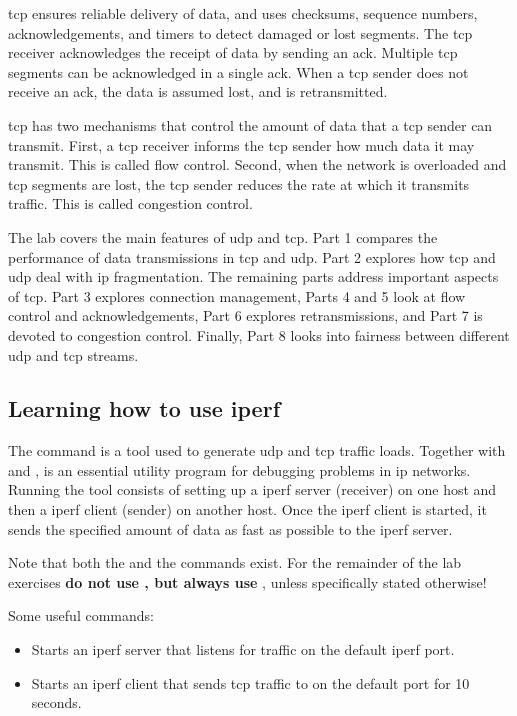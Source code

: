 \ac{tcp} ensures reliable delivery of data, and uses checksums, sequence numbers, acknowledgements, and timers to detect damaged or lost segments. The \ac{tcp} receiver acknowledges the receipt of data by sending an \ac{ack}. Multiple \ac{tcp} segments can be acknowledged in a single \ac{ack}. When a \ac{tcp} sender does not receive an \ac{ack}, the data is assumed lost, and is retransmitted.

\ac{tcp} has two mechanisms that control the amount of data that a \ac{tcp} sender can transmit. First, a \ac{tcp} receiver informs the \ac{tcp} sender how much data it may transmit. This is called flow control. Second, when the network is overloaded and \ac{tcp} segments are lost, the \ac{tcp} sender reduces the rate at which it transmits traffic. This is called congestion control.

The lab covers the main features of \ac{udp} and \ac{tcp}. Part 1 compares the performance of data transmissions in \ac{tcp} and \ac{udp}. Part 2 explores how \ac{tcp} and \ac{udp} deal with \acs{ip} fragmentation. The remaining parts address important aspects of \ac{tcp}. Part 3 explores connection management, Parts 4 and 5 look at flow control and acknowledgements, Part 6 explores retransmissions, and Part 7 is devoted to congestion control. Finally, Part 8 looks into fairness between different \ac{udp} and \ac{tcp} streams.

\newpage
\subsection{Learning how to use iperf}

The  command is a tool used to generate \ac{udp} and \ac{tcp} traffic loads. Together with  and ,  is an essential utility program for debugging problems in \acs{ip} networks. Running the  tool consists of setting up a iperf server (receiver) on one host and then a iperf client (sender) on another host. Once the iperf client is started, it sends the specified amount of data as fast as possible to the iperf server.

\remark Note that both the  and the  commands exist. For the remainder of the lab exercises \textbf{do not use , but always use }, unless specifically stated otherwise!

Some useful  commands:
\begin{framed}
	\begin{itemize}
		\item {}\newline Starts an iperf server that  listens for traffic on the default iperf port.
		\item {}\newline Starts an iperf client that sends \acs{tcp} traffic to  on the default port for 10 seconds.
	\end{itemize}
\end{framed}

